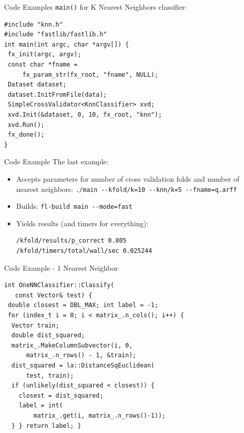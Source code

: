 \documentclass[pdf,colorBG,slideColor]{prosper}
\begin{document}
\begin{slide}{Code Examples}
 {\tt main()} for K Nearest Neighbors classifier:
 \vspace*{.2in}
\begin{verbatim}
#include "knn.h"
#include "fastlib/fastlib.h"
int main(int argc, char *argv[]) {
 fx_init(argc, argv);
 const char *fname =
     fx_param_str(fx_root, "fname", NULL);
 Dataset dataset;
 dataset.InitFromFile(data);
 SimpleCrossValidator<KnnClassifier> xvd;
 xvd.Init(&dataset, 0, 10, fx_root, "knn");
 xvd.Run();
 fx_done();
}
\end{verbatim}
\end{slide}

\begin{slide}{Code Example}
 \vspace*{.3in}
 The last example: \\
 \begin{itemize}
 \item Accepts parameters for number of cross validation folds and number
 of nearest neighbors: \verb|./main --kfold/k=10 --knn/k=5 --fname=q.arff|
 \item Builds: \verb|fl-build main --mode=fast|
 \item Yields results (and timers for everything):
\begin{verbatim}
/kfold/results/p_correct 0.805
/kfold/timers/total/wall/sec 0.025244
\end{verbatim}
 \end{itemize}
\end{slide}

\begin{slide}{Code Example - 1 Nearest Neighbor}
 \vspace*{-0.2in}
 \hspace*{-0.4in}
\begin{verbatim}
int OneNNClassifier::Classify(
   const Vector& test) {
 double closest = DBL_MAX; int label = -1;
 for (index_t i = 0; i < matrix_.n_cols(); i++) {
  Vector train;
  double dist_squared;
  matrix_.MakeColumnSubvector(i, 0,
      matrix_.n_rows() - 1, &train);
  dist_squared = la::DistanceSqEuclidean(
      test, train);
  if (unlikely(dist_squared < closest)) {
    closest = dist_squared;
    label = int(
        matrix_.get(i, matrix_.n_rows()-1));
  } } return label; }
\end{verbatim}
\end{slide}
\end{document}
